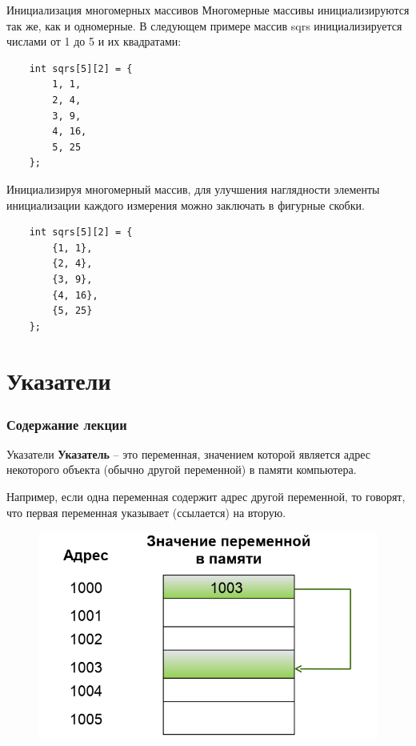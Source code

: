 \documentclass{beamer}
\begin{document}
\begin{frame}[fragile]{Инициализация многомерных массивов}
    Многомерные массивы инициализируются так же, как и одномерные. В следующем примере массив sqrs инициализируется числами от 1 до 5 и их квадратами:
    
    \begin{verbatim}
    int sqrs[5][2] = {
        1, 1,
        2, 4,
        3, 9,
        4, 16,
        5, 25
    };
    \end{verbatim}
    
    Инициализируя многомерный массив, для улучшения наглядности элементы инициализации каждого измерения можно заключать в фигурные скобки. 
    \begin{verbatim}
    int sqrs[5][2] = {
        {1, 1},
        {2, 4},
        {3, 9},
        {4, 16},
        {5, 25}
    };
    \end{verbatim}
\end{frame}

\section{Указатели}

\begin{frame}
  \frametitle{Содержание лекции}
  \tableofcontents[current]
\end{frame}

\begin{frame}{Указатели}
    \textbf{Указатель} -- это переменная, значением которой является адрес некоторого объекта (обычно другой переменной) в памяти компьютера.
    
    \medskip
    Например, если одна переменная содержит адрес другой переменной, то говорят, что первая переменная указывает (ссылается) на вторую.
    
    \begin{figure}[h]
    \centering
    \includegraphics[scale=0.4]{pointer.png}
    \end{figure}
\end{frame}
\end{document}
